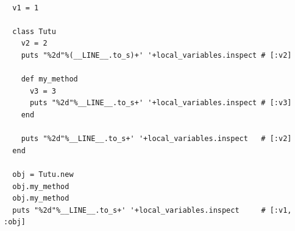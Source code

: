   \begin{latexonly}
    \begin{lstlisting}

  v1 = 1                  
  
  class Tutu
    v2 = 2                
    puts "%2d"%(__LINE__.to_s)+' '+local_variables.inspect # [:v2]
  
    def my_method
      v3 = 3
      puts "%2d"%__LINE__.to_s+' '+local_variables.inspect # [:v3]
    end
  
    puts "%2d"%__LINE__.to_s+' '+local_variables.inspect   # [:v2] 
  end
  
  obj = Tutu.new
  obj.my_method        
  obj.my_method        
  puts "%2d"%__LINE__.to_s+' '+local_variables.inspect     # [:v1, :obj]

    \end{lstlisting}
  \end{latexonly}
